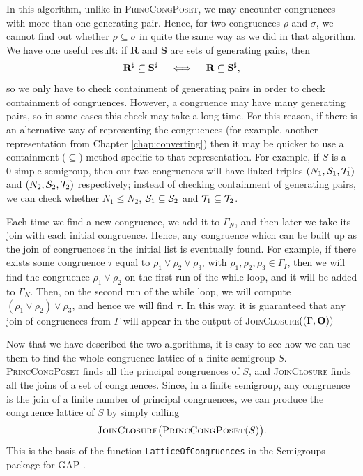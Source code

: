 In this algorithm, unlike in \textsc{PrincCongPoset}, we may encounter
congruences with more than one generating pair.  Hence, for two congruences
$\rho$ and $\sigma$, we cannot find out whether $\rho \subseteq \sigma$ in quite
the same way as we did in that algorithm.  We have one useful result: if
$\mathbf{R}$ and $\mathbf{S}$ are sets of generating pairs, then
$$\mathbf{R}^\sharp \subseteq \mathbf{S}^\sharp \quad\iff\quad
\mathbf{R} \subseteq \mathbf{S}^\sharp,$$
so we only have to check containment of generating pairs in order to check
containment of congruences.  However, a congruence may have many generating
pairs, so in some cases this check may take a long time.  For this reason, if
there is an alternative way of representing the congruences (for example,
another representation from Chapter \ref{chap:converting}) then it may be
quicker to use a containment ($\subseteq$) method specific to that
representation.  For example, if $S$ is a 0-simple semigroup, then our two
congruences will have linked triples $(N_1,\mathcal{S}_1,\mathcal{T}_1)$ and $(N_2,\mathcal{S}_2,\mathcal{T}_2)$
respectively; instead of checking containment of generating pairs, we can check
whether $N_1 \leq N_2$, $\mathcal{S}_1 \subseteq \mathcal{S}_2$ and $\mathcal{T}_1 \subseteq \mathcal{T}_2$.

Each time we find a new congruence, we add it to $\Gamma_N$, and then later we
take its join with each initial congruence.  Hence, any congruence which can be
built up as the join of congruences in the initial list is eventually found.
For example, if there exists some congruence $\tau$ equal to
$\rho_1 \vee \rho_2 \vee \rho_3$, with $\rho_1,\rho_2,\rho_3 \in \Gamma_I$, then
we will find the congruence $\rho_1 \vee \rho_2$ on the first run of the while
loop, and it will be added to $\Gamma_N$.  Then, on the second run of the while
loop, we will compute $(\rho_1 \vee \rho_2) \vee \rho_3$, and hence we will find
$\tau$.  In this way, it is guaranteed that any join of congruences from
$\Gamma$ will appear in the output of
\textsc{JoinClosure}$((\Gamma, \mathbf{O}))$

Now that we have described the two algorithms, it is easy to see how we can use
them to find the whole congruence lattice of a finite semigroup $S$.
\textsc{PrincCongPoset} finds all the principal congruences of $S$, and
\textsc{JoinClosure} finds all the joins of a set of congruences.  Since, in a
finite semigroup, any congruence is the join of a finite number of principal
congruences, we can produce the congruence lattice of $S$ by simply calling
$$\textsc{JoinClosure\big(PrincCongPoset($S$)\big)}.$$  This is the basis of the
function \texttt{LatticeOfCongruences} in the Semigroups package for GAP
\cite{semigroups}.


